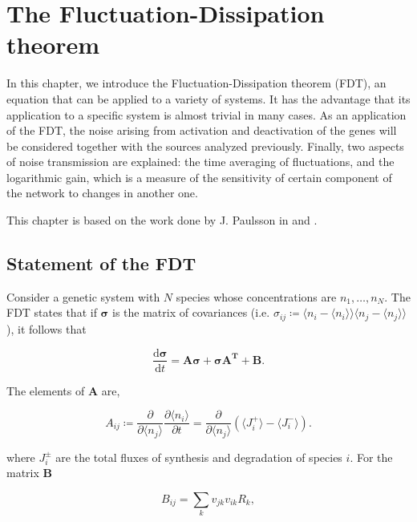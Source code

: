 \chapter{The Fluctuation-Dissipation theorem}
\label{ch:fdt}

In this chapter, we introduce the Fluctuation-Dissipation theorem (FDT), an equation that can be applied to a variety of systems. It has the advantage that its application to a specific system is almost trivial in many cases. As an application of the FDT, the noise arising from activation and deactivation of the genes will be considered together with the sources analyzed previously. Finally, two aspects of noise transmission are explained: the time averaging of fluctuations, and the logarithmic gain, which is a measure of the sensitivity of certain component of the network to changes in another one.

This chapter is based on the work done by J. Paulsson in \cite{paulsson04} and \cite{paulsson05}.

\section{Statement of the FDT}

Consider a genetic system with $N$ species whose concentrations are $n_1,\dotsc,n_N$. The FDT states that if $\mathbf{\sigma}$ is the matrix of covariances (i.e. $\sigma_{ij} \coloneqq \langle n_i-\langle n_i\rangle\rangle\langle n_j-\langle n_j\rangle\rangle$), it follows that 

\begin{equation*}
  \frac{\mathrm{d}\mathbf{\sigma}}{\mathrm{d}t} = \mathbf{A\sigma} + \mathbf{\sigma A^T}+\mathbf{B}.
\end{equation*}

The elements of $\mathbf{A}$ are,

\begin{equation}
  \label{eq:fdt-Adef}
  A_{ij} \coloneqq \frac{\partial}{\partial \langle n_j\rangle}\frac{\partial \langle n_i\rangle}{\partial t} = \frac{\partial}{\partial \langle n_j\rangle}\left(\langle J_i^+\rangle - \langle J_i^-\rangle\right).
\end{equation}

where $J_i^\pm$ are the total fluxes of synthesis and degradation of species $i$. For the matrix $\mathbf{B}$

\begin{equation}
  \label{eq:fdt-Bdef}
  B_{ij} = \sum_k v_{jk}v_{ik}R_k,
\end{equation}

